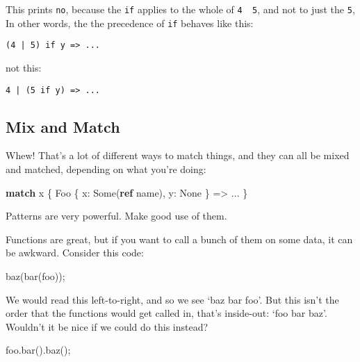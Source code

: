 \documentclass[a4paper,]{book}
\newenvironment{Shaded}{\begin{snugshade}}{\end{snugshade}}
\newcommand{\KeywordTok}[1]{\textcolor[rgb]{0.13,0.29,0.53}{\textbf{{#1}}}}
\newcommand{\ConstantTok}[1]{\textcolor[rgb]{0.00,0.00,0.00}{{#1}}}
\newcommand{\NormalTok}[1]{{#1}}
\begin{document}
This prints \texttt{no}, because the \texttt{if} applies to the whole of
\texttt{4\ \textbar{}\ 5}, and not to just the \texttt{5}, In other
words, the the precedence of \texttt{if} behaves like this:

\begin{verbatim}
(4 | 5) if y => ...
\end{verbatim}

not this:

\begin{verbatim}
4 | (5 if y) => ...
\end{verbatim}

\subsection{Mix and Match}\label{mix-and-match}

Whew! That's a lot of different ways to match things, and they can all
be mixed and matched, depending on what you're doing:

\begin{Shaded}
\begin{Highlighting}[]
\KeywordTok{match} \NormalTok{x \{}
    \NormalTok{Foo \{ x: }\ConstantTok{Some}\NormalTok{(}\KeywordTok{ref} \NormalTok{name), y: }\ConstantTok{None} \NormalTok{\} => ...}
\NormalTok{\}}
\end{Highlighting}
\end{Shaded}

Patterns are very powerful. Make good use of them.


Functions are great, but if you want to call a bunch of them on some
data, it can be awkward. Consider this code:

\begin{Shaded}
\begin{Highlighting}[]
\NormalTok{baz(bar(foo));}
\end{Highlighting}
\end{Shaded}

We would read this left-to-right, and so we see `baz bar foo'. But this
isn't the order that the functions would get called in, that's
inside-out: `foo bar baz'. Wouldn't it be nice if we could do this
instead?

\begin{Shaded}
\begin{Highlighting}[]
\NormalTok{foo.bar().baz();}
\end{Highlighting}
\end{Shaded}
\end{document}
